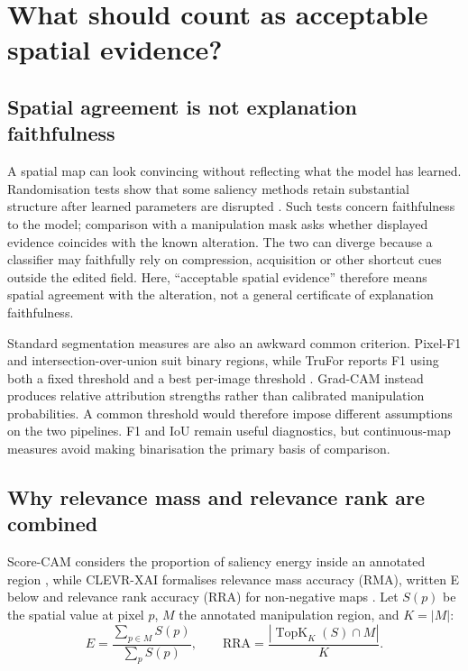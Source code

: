
\section{What should count as acceptable spatial evidence?}
\label{sec:lr-metrics}

\subsection{Spatial agreement is not explanation faithfulness}

A spatial map can look convincing without reflecting what the model has learned. Randomisation tests show that some saliency methods retain substantial structure after learned parameters are disrupted \citep{adebayo2018sanity}. Such tests concern faithfulness to the model; comparison with a manipulation mask asks whether displayed evidence coincides with the known alteration. The two can diverge because a classifier may faithfully rely on compression, acquisition or other shortcut cues outside the edited field. Here, ``acceptable spatial evidence'' therefore means spatial agreement with the alteration, not a general certificate of explanation faithfulness.

Standard segmentation measures are also an awkward common criterion. Pixel-F1 and intersection-over-union suit binary regions, while TruFor reports F1 using both a fixed threshold and a best per-image threshold \citep{guillaro2023trufor}. Grad-CAM instead produces relative attribution strengths rather than calibrated manipulation probabilities. A common threshold would therefore impose different assumptions on the two pipelines. F1 and IoU remain useful diagnostics, but continuous-map measures avoid making binarisation the primary basis of comparison.

\subsection{Why relevance mass and relevance rank are combined}

Score-CAM considers the proportion of saliency energy inside an annotated region \citep{wang2020scorecam}, while CLEVR-XAI formalises relevance mass accuracy (RMA), written E below and relevance rank accuracy (RRA) for non-negative maps \citep{arras2022clevrxai}. Let $S(p)$ be the spatial value at pixel $p$, $M$ the annotated manipulation region, and $K=|M|$:
\begin{equation}
E=\frac{\sum_{p\in M}S(p)}{\sum_{p}S(p)},
\qquad
\mathrm{RRA}=\frac{|\operatorname{TopK}_{K}(S)\cap M|}{K}.
\label{eq:lr-mass-rank}
\end{equation}

